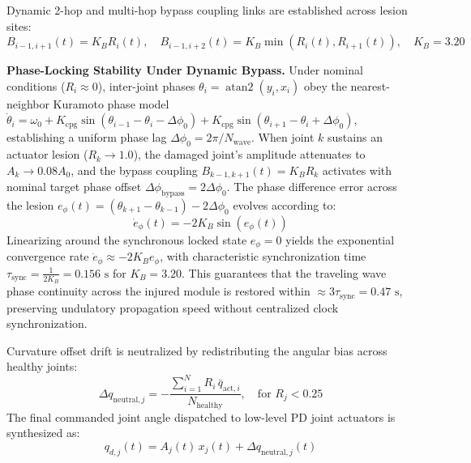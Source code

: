 \documentclass{iopjournal}
\begin{document}
Dynamic 2-hop and multi-hop bypass coupling links are established across lesion sites:
\begin{equation}
B_{i-1,i+1}(t) = K_B R_i(t), \quad B_{i-1,i+2}(t) = K_B \min(R_i(t), R_{i+1}(t)), \quad K_B = 3.20
\label{eq:bypass_coupling}
\end{equation}

\vspace{0.5em}
\noindent\textbf{Phase-Locking Stability Under Dynamic Bypass.} Under nominal conditions ($R_i \approx 0$), inter-joint phases $\theta_i = \operatorname{atan2}(y_i, x_i)$ obey the nearest-neighbor Kuramoto phase model $\dot{\theta}_i = \omega_0 + K_{\text{cpg}} \sin(\theta_{i-1} - \theta_i - \Delta\phi_0) + K_{\text{cpg}} \sin(\theta_{i+1} - \theta_i + \Delta\phi_0)$, establishing a uniform phase lag $\Delta\phi_0 = 2\pi / N_{\text{wave}}$. When joint $k$ sustains an actuator lesion ($R_k \to 1.0$), the damaged joint's amplitude attenuates to $A_k \to 0.08 A_0$, and the bypass coupling $B_{k-1, k+1}(t) = K_B R_k$ activates with nominal target phase offset $\Delta\phi_{\text{bypass}} = 2\Delta\phi_0$. The phase difference error across the lesion $e_\phi(t) = (\theta_{k+1} - \theta_{k-1}) - 2\Delta\phi_0$ evolves according to:
\begin{equation}
\dot{e}_\phi(t) = -2 K_B \sin(e_\phi(t))
\end{equation}
Linearizing around the synchronous locked state $e_\phi = 0$ yields the exponential convergence rate $\dot{e}_\phi \approx -2 K_B e_\phi$, with characteristic synchronization time $\tau_{\text{sync}} = \frac{1}{2 K_B} = 0.156\text{ s}$ for $K_B = 3.20$. This guarantees that the traveling wave phase continuity across the injured module is restored within $\approx 3 \tau_{\text{sync}} = 0.47\text{ s}$, preserving undulatory propagation speed without centralized clock synchronization.

Curvature offset drift is neutralized by redistributing the angular bias across healthy joints:
\begin{equation}
\Delta q_{\text{neutral},j} = -\frac{\sum_{i=1}^N R_i\,\bar{q}_{\text{act},i}}{N_{\text{healthy}}}, \quad \text{for } R_j < 0.25
\label{eq:yaw_steering}
\end{equation}
The final commanded joint angle dispatched to low-level PD joint actuators is synthesized as:
\begin{equation}
q_{d, j}(t) = A_j(t)\, x_j(t) + \Delta q_{\text{neutral},j}(t)
\label{eq:final_command}
\end{equation}
\end{document}
